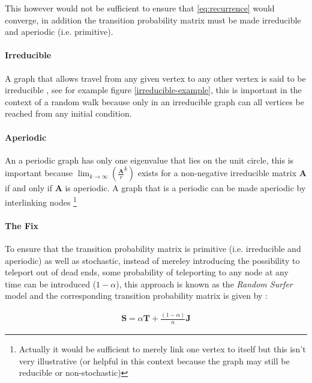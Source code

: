 \documentclass[11pt]{report}
\begin{document}
This however would not be sufficient to ensure that \eqref{eq:recurrence} would converge, in addition the transition probability matrix must be made irreducible and aperiodic (i.e. primitive). \cite{langvilleGooglePageRankScience2012}


\paragraph{Irreducible}
\label{sec:org578c303}
A graph that allows travel from any given vertex to any other vertex is said to be irreducible \cite{langvilleGooglePageRankScience2012}, see for example figure \ref{irreducible-example}, this is important in the context of a random walk because only in an irreducible graph can all vertices be reached from any initial condition.


\paragraph{Aperiodic}
\label{sec:org2c6170b}
An a periodic graph has only one eigenvalue that lies on the unit circle, this is important because \(\lim_{k\rightarrow \infty} \left( \frac{\mathbf{A}}{r}^{k} \right)\) exists for a non-negative irreducible matrix \(\mathbf{A}\) if and only if \(\mathbf{A}\) is aperiodic. A graph that is a periodic can be made aperiodic by interlinking nodes \footnote{Actually it would be sufficient to merely link one vertex to itself \cite[]{langvilleGooglePageRankScience2012} but this isn't very illustrative (or helpful in this context because the graph may still be reducible or non-stochastic)}


\paragraph{The Fix}
\label{fix}
To ensure that the transition probability matrix is primitive (i.e. irreducible and aperiodic) as well as stochastic, instead of mereley introducing the possibility to teleport out of dead ends, some probability of teleporting to any node at any time can be introduced (\(1- \alpha\)), this approach is known as the \emph{Random Surfer} model and the corresponding transition probability matrix is given by \cite{larrypageAnatomyLargescaleHypertextual1998} :

\begin{align}
\mathbf{S} = \alpha \mathbf{T} + \frac{(1- \alpha)}{n} \mathbf{J} \label{eq:random-surfer}
\end{align}
\end{document}
